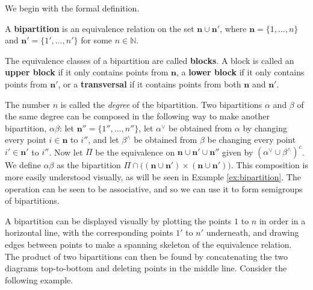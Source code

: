 We begin with the formal definition.

\begin{definition}
  \label{def:bipartition}
  A \textbf{bipartition} is an equivalence relation on the set
  $\mathbf{n} \cup \mathbf{n}'$, where $\mathbf{n} = \{1, \ldots, n\}$ and
  $\mathbf{n}' = \{1', \ldots, n'\}$ for some $n \in \mathbb{N}$.
\end{definition}

The equivalence classes of a bipartition are called \textbf{blocks}.  A block is
called an \textbf{upper block} if it only contains points from $\mathbf{n}$, a
\textbf{lower block} if it only contains points from $\mathbf{n}'$, or a
\textbf{transversal} if it contains points from both $\mathbf{n}$ and
$\mathbf{n}'$.

The number $n$ is called the \textit{degree} of the
bipartition.   Two
bipartitions $\alpha$ and $\beta$ of the same degree can be composed in the
following way to make another bipartition, $\alpha \beta$: let
$\mathbf{n}'' = \{1'', \ldots, n''\}$, let $\alpha^\vee$ be obtained from
$\alpha$ by changing every point $i \in \mathbf{n}$ to $i''$, and let
$\beta^\wedge$ be obtained from $\beta$ be changing every point
$i' \in \mathbf{n}'$ to $i''$.  Now let $\Pi$ be the equivalence on
$\mathbf{n} \cup \mathbf{n}' \cup \mathbf{n}''$ given by
$(\alpha^\vee \cup \beta^\wedge)^e$.  We define $\alpha \beta$ as the
bipartition
$\Pi \cap \big((\mathbf{n} \cup \mathbf{n}') \times (\mathbf{n} \cup
\mathbf{n}')\big)$.  This composition is more easily understood visually, as
will be seen in Example \ref{ex:bipartition}.  The operation can be seen to be
associative, and so we can use it to form semigroups of bipartitions.

A bipartition can be displayed visually by plotting the points $1$ to $n$ in
order in a horizontal line, with the corresponding points $1'$ to $n'$
underneath, and drawing edges between points to make a spanning skeleton of the
equivalence relation.  The product of two bipartitions can then be found by
concatenating the two diagrams top-to-bottom and deleting points in the middle
line.  Consider the following example.

